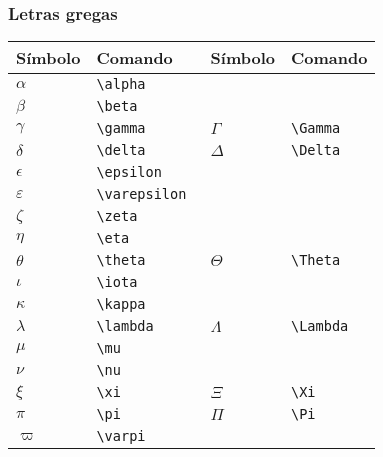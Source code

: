 \documentclass[brazilian]{beamer}
\begin{document}
\begin{frame}[fragile]
    \frametitle{Letras gregas}
\tiny
    \begin{table}
        \begin{tabular}{O{1.5cm}l||O{1.5cm}l}
            Símbolo & Comando & Símbolo & Comando \\ \hline
            \(\alpha \) & \lstinline[style=myStyleLatex]!\alpha ! & & \\ \hline
            \(\beta \) & \lstinline[style=myStyleLatex]!\beta ! & & \\ \hline
            \(\gamma \) & \lstinline[style=myStyleLatex]!\gamma ! & \(\Gamma\) & \lstinline[style=myStyleLatex]!\Gamma !\\ \hline
            \(\delta \) & \lstinline[style=myStyleLatex]!\delta ! & \(\Delta \) & \lstinline[style=myStyleLatex]!\Delta !\\ \hline
            \(\epsilon \) & \lstinline[style=myStyleLatex]!\epsilon ! & & \\ \hline
            \(\varepsilon \) & \lstinline[style=myStyleLatex]!\varepsilon ! & & \\ \hline
            \(\zeta \) & \lstinline[style=myStyleLatex]!\zeta ! & & \\ \hline
            \(\eta \) & \lstinline[style=myStyleLatex]!\eta ! & & \\ \hline
            \(\theta \) & \lstinline[style=myStyleLatex]!\theta ! & \(\Theta \) & \lstinline[style=myStyleLatex]!\Theta ! \\ \hline
            \(\iota \) & \lstinline[style=myStyleLatex]!\iota ! & & \\ \hline
            \(\kappa \) & \lstinline[style=myStyleLatex]!\kappa ! & & \\ \hline
            \(\lambda \) & \lstinline[style=myStyleLatex]!\lambda ! & \(\Lambda \) & \lstinline[style=myStyleLatex]!\Lambda ! \\ \hline
            \(\mu \) & \lstinline[style=myStyleLatex]!\mu ! & & \\ \hline
            \(\nu \) & \lstinline[style=myStyleLatex]!\nu ! & & \\ \hline
            \(\xi \) & \lstinline[style=myStyleLatex]!\xi ! & \(\Xi \) & \lstinline[style=myStyleLatex]!\Xi ! \\ \hline
            \(\pi \) & \lstinline[style=myStyleLatex]!\pi ! & \(\Pi \) & \lstinline[style=myStyleLatex]!\Pi ! \\ \hline
            \(\varpi \) & \lstinline[style=myStyleLatex]!\varpi ! & & \\ \hline

\end{tabular}
\end{table}
\end{frame}
\end{document}
